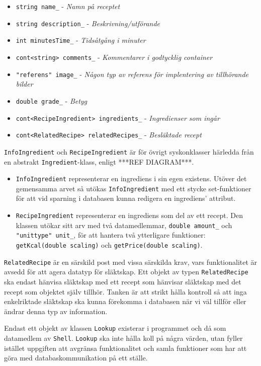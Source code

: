 \begin{itemize}
\item \verb+string name_+ - \emph{Namn på receptet}
\item \verb+string description_+ - \emph{Beskrivning/utförande}
\item \verb+int minutesTime_+ - \emph{Tidsåtgång i minuter}
\item \verb+cont<string> comments_+ - \emph{Kommentarer i godtycklig container}
\item \verb+"referens" image_+ - \emph{Någon typ av referens för implentering av tillhörande bilder}
\item \verb+double grade_+ - \emph{Betyg}
\end{itemize}

\begin{itemize}
\item \verb+cont<RecipeIngredient> ingredients_+ - \emph{Ingredienser som ingår}
\item \verb+cont<RelatedRecipe> relatedRecipes_+ - \emph{Besläktade recept}
\end{itemize}

\verb+InfoIngredient+ och \verb+RecipeIngredient+ är för övrigt syskonklasser härledda från en abstrakt \verb+Ingredient+-klass, enligt ***REF DIAGRAM***.

\begin{itemize}
\item \verb+InfoIngredient+ representerar en ingrediens i sin egen existens. Utöver det gemensamma arvet så utökas \verb+InfoIngredient+ med ett stycke set-funktioner för att vid sparning i databasen kunna redigera en ingrediens' attribut. 
\item \verb+RecipeIngredient+ representerar en ingrediens som del av ett recept. Den klassen utökar sitt arv med två datamedlemmar, \verb+double amount_+ och \verb+"unittype" unit_+, för att hantera två ytterligare funktioner: \verb+getKcal(double scaling)+ och \verb+getPrice(double scaling)+.
\end{itemize}
 
\verb+RelatedRecipe+ är en särskild post med vissa särskilda krav, vars funktionalitet är avsedd för att agera datatyp för släktskap. Ett objekt av typen \verb+RelatedRecipe+ ska endast hänvisa släktskap med ett recept som hänvisar släktskap med det recept som objektet själv tillhör. Tanken är att strikt hålla kontroll så att inga enkelriktade släktskap ska kunna förekomma i databasen när vi väl tillför eller ändrar denna typ av information.

Endast ett objekt av klassen \verb+Lookup+ existerar i programmet och då som datamedlem av \verb+Shell+. \verb+Lookup+ ska inte hålla koll på några värden, utan fyller istället uppgiften att avgränsa funktionalitet och samla funktioner som har att göra med databaskommunikation på ett ställe.



    

